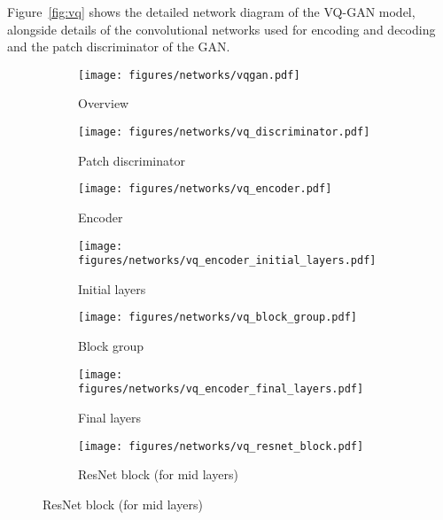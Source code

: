 Figure~\ref{fig:vq} shows the detailed network diagram of the VQ-GAN model, alongside details of the convolutional networks used for encoding and decoding and the patch discriminator of the GAN.

\begin{figure}
    \centering
    \begin{subfigure}[t]{.6\textwidth}
        \centering
        \texttt{[image: figures/networks/vqgan.pdf]}
        \caption{Overview\label{fig:vq:vqgan}}
    \end{subfigure}
    \hfill
    \begin{subfigure}[t]{.29\textwidth}
        \centering
        \texttt{[image: figures/networks/vq\_discriminator.pdf]}
        \caption{Patch discriminator\label{fig:vq:discriminator}}
    \end{subfigure}
    \par\bigskip %
    \begin{subfigure}[c]{.3\textwidth}
        \centering
        \texttt{[image: figures/networks/vq\_encoder.pdf]}
        \caption{Encoder \label{fig:vq:enc}}
    \end{subfigure}
    \hfill
    \begin{subfigure}[c]{.3\textwidth}
        \centering
        \texttt{[image: figures/networks/vq\_encoder\_initial\_layers.pdf]}
        \caption{Initial layers \label{fig:vq:enc:initial_layers}}
    \end{subfigure}
    \hfill
    \begin{subfigure}[c]{.3\textwidth}
        \centering
        \texttt{[image: figures/networks/vq\_block\_group.pdf]}
        \caption{Block group \label{fig:vq:enc:block_group}}
    \end{subfigure}
    \par\bigskip %
    \begin{subfigure}[c]{.3\textwidth}
        \centering
        \texttt{[image: figures/networks/vq\_encoder\_final\_layers.pdf]}
        \caption{Final layers \label{fig:vq:enc:final_layers}}
    \end{subfigure}
    \hfill
    \begin{subfigure}[c]{0.3\textwidth}
        \centering
        \texttt{[image: figures/networks/vq\_resnet\_block.pdf]}
        \caption{ResNet block (for mid layers)\label{fig:vq:enc:mid:resnet_block}}
    \end{subfigure}
    \hfill %

\end{figure}
